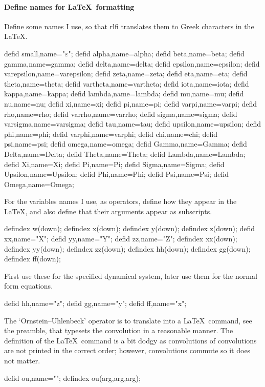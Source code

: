 \documentclass[11pt,a5paper]{article}
\def\ou\big(#1,#2,#3\big)%
\def\eps{\ensuremath{\varepsilon}}
\begin{document}
\paragraph{Define names for \LaTeX\ formatting}

Define some names I use, so that rlfi translates them to
Greek characters in the \LaTeX.
\begin{reduce}
defid small,name="\eps";%
defid alpha,name=alpha;
defid beta,name=beta;
defid gamma,name=gamma;
defid delta,name=delta;
defid epsilon,name=epsilon;
defid varepsilon,name=varepsilon;
defid zeta,name=zeta;
defid eta,name=eta;
defid theta,name=theta;
defid vartheta,name=vartheta;
defid iota,name=iota;
defid kappa,name=kappa;
defid lambda,name=lambda;
defid mu,name=mu;
defid nu,name=nu;
defid xi,name=xi;
defid pi,name=pi;
defid varpi,name=varpi;
defid rho,name=rho;
defid varrho,name=varrho;
defid sigma,name=sigma;
defid varsigma,name=varsigma;
defid tau,name=tau;
defid upsilon,name=upsilon;
defid phi,name=phi;
defid varphi,name=varphi;
defid chi,name=chi;
defid psi,name=psi;
defid omega,name=omega;
defid Gamma,name=Gamma;
defid Delta,name=Delta;
defid Theta,name=Theta;
defid Lambda,name=Lambda;
defid Xi,name=Xi;
defid Pi,name=Pi;
defid Sigma,name=Sigma;
defid Upsilon,name=Upsilon;
defid Phi,name=Phi;
defid Psi,name=Psi;
defid Omega,name=Omega;
\end{reduce}

For the variables names I use, as operators, define how they
appear in the \LaTeX, and also define that their arguments
appear as subscripts.
\begin{reduce}
defindex w(down);
defindex x(down);
defindex y(down);
defindex z(down);
defid xx,name="X";
defid yy,name="Y";
defid zz,name="Z";
defindex xx(down);
defindex yy(down);
defindex zz(down);
defindex hh(down);
defindex gg(down);
defindex ff(down);
\end{reduce}

First use these for the specified dynamical system, later
use them for the normal form equations.
\begin{reduce}
defid hh,name="\dot z";
defid gg,name="\dot y";
defid ff,name="\dot x";
\end{reduce}

The `Ornstein--Uhlenbeck' operator is to translate into a
\LaTeX\ command, see the preamble, that typesets the
convolution in a reasonable manner. The definition of the
\LaTeX\ command is a bit dodgy as convolutions of
convolutions are not printed in the correct order; however, 
convolutions commute so it does not matter.
\begin{reduce}
defid ou,name="\ou";
defindex ou(arg,arg,arg);
\end{reduce}
\end{document}

